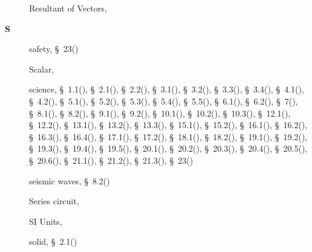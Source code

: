 \begin{multicols}{2}
{\begin{description}
	  \item[] \noindent\raggedright Resultant of Vectors,  \pageref{id2512331}
	  \vspace{.3cm}
	  \item[{\large \bfseries S}]\noindent\raggedright
	  safety,  \S~23(\pageref{m38491})
	  
	  \item[] \noindent\raggedright Scalar,  \pageref{id2510220}
	  
	  \item[] \noindent\raggedright science,  \S~1.1(\pageref{m38708}),  \S~2.1(\pageref{m38736}),  \S~2.2(\pageref{m38734}),  \S~3.1(\pageref{m38756}),  \S~3.2(\pageref{m38745}),  \S~3.3(\pageref{m38753}),  \S~3.4(\pageref{m38741}),  \S~4.1(\pageref{m38760}),  \S~4.2(\pageref{m38757}),  \S~5.1(\pageref{m38704}),  \S~5.2(\pageref{m38701}),  \S~5.3(\pageref{m38684}),  \S~5.4(\pageref{m38694}),  \S~5.5(\pageref{m38689}),  \S~6.1(\pageref{m38801}),  \S~6.2(\pageref{m38802}),  \S~7(\pageref{m38806}),  \S~8.1(\pageref{m38782}),  \S~8.2(\pageref{m38783}),  \S~9.1(\pageref{m38799}),  \S~9.2(\pageref{m38800}),  \S~10.1(\pageref{m38777}),  \S~10.2(\pageref{m38778}),  \S~10.3(\pageref{m38779}),  \S~12.1(\pageref{m38709}),  \S~12.2(\pageref{m38711}),  \S~13.1(\pageref{m38721}),  \S~13.2(\pageref{m38726}),  \S~13.3(\pageref{m38727}),  \S~15.1(\pageref{m38780}),  \S~15.2(\pageref{m38781}),  \S~16.1(\pageref{m38771}),  \S~16.2(\pageref{m38772}),  \S~16.3(\pageref{m38773}),  \S~16.4(\pageref{m38776}),  \S~17.1(\pageref{m38720}),  \S~17.2(\pageref{m38719}),  \S~18.1(\pageref{m38717}),  \S~18.2(\pageref{m38712}),  \S~19.1(\pageref{m38812}),  \S~19.2(\pageref{m38813}),  \S~19.3(\pageref{m38815}),  \S~19.4(\pageref{m38816}),  \S~19.5(\pageref{m38819}),  \S~20.1(\pageref{m38787}),  \S~20.2(\pageref{m38788}),  \S~20.3(\pageref{m38791}),  \S~20.4(\pageref{m38794}),  \S~20.5(\pageref{m38795}),  \S~20.6(\pageref{m38796}),  \S~21.1(\pageref{m38784}),  \S~21.2(\pageref{m38785}),  \S~21.3(\pageref{m38786}),  \S~23(\pageref{m38491})
	  
	  \item[] \noindent\raggedright seismic waves,  \S~8.2(\pageref{m38783})
	  
	  \item[] \noindent\raggedright Series circuit,  \pageref{id2478736}
	  
	  \item[] \noindent\raggedright SI Units,  \pageref{id2398560}
	  
	  \item[] \noindent\raggedright solid,  \S~2.1(\pageref{m38736})
	  

\end{description}}
\end{multicols}

